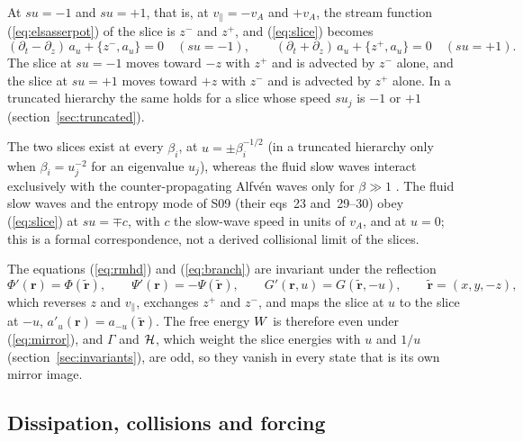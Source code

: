 At $su=-1$ and $su=+1$, that is, at $v_\parallel=-v_A$ and $+v_A$, the stream function (\ref{eq:elsasserpot}) of the slice is $z^-$ and $z^+$, and (\ref{eq:slice}) becomes
\begin{equation}\label{sl:elsasser}
  (\partial_t-\partial_z)\,a_u+\{z^-,a_u\}=0\quad(su=-1),\qquad
  (\partial_t+\partial_z)\,a_u+\{z^+,a_u\}=0\quad(su=+1).
\end{equation}
The slice at $su=-1$ moves toward $-z$ with $z^+$ and is advected by $z^-$ alone, and the slice at $su=+1$ moves toward $+z$ with $z^-$ and is advected by $z^+$ alone. In a truncated hierarchy the same holds for a slice whose speed $su_j$ is $-1$ or $+1$ (section~\ref{sec:truncated}).

The two slices exist at every $\beta_i$, at $u=\pm\beta_i^{-1/2}$ (in a truncated hierarchy only when $\beta_i=u_j^{-2}$ for an eigenvalue $u_j$), whereas the fluid slow waves interact exclusively with the counter-propagating Alfv\'en waves only for $\beta\gg1$ \citetext{S09, \S2.5, eq.~30 and footnote~15; \citealp[\S2.4]{LithwickGoldreich2001}}. The fluid slow waves and the entropy mode of S09 (their eqs~23 and~29--30) obey (\ref{eq:slice}) at $su=\mp c$, with $c$ the slow-wave speed in units of $v_A$, and at $u=0$; this is a formal correspondence, not a derived collisional limit of the slices.

The equations (\ref{eq:rmhd}) and (\ref{eq:branch}) are invariant under the reflection
\begin{equation}\label{eq:mirror}
  \Phi'(\boldsymbol r)=\Phi(\tilde{\boldsymbol r}),\qquad
  \Psi'(\boldsymbol r)=-\Psi(\tilde{\boldsymbol r}),\qquad
  G'(\boldsymbol r,u)=G(\tilde{\boldsymbol r},-u),\qquad
  \tilde{\boldsymbol r}=(x,y,-z),
\end{equation}
which reverses $z$ and $v_\parallel$, exchanges $z^+$ and $z^-$, and maps the slice at $u$ to the slice at $-u$, $a'_u(\boldsymbol r)=a_{-u}(\tilde{\boldsymbol r})$. The free energy $W$ is therefore even under (\ref{eq:mirror}), and $\Gamma$ and $\mathcal H$, which weight the slice energies with $u$ and $1/u$ (section~\ref{sec:invariants}), are odd, so they vanish in every state that is its own mirror image.

\subsection{Dissipation, collisions and forcing}\label{sl:forcingsec}

